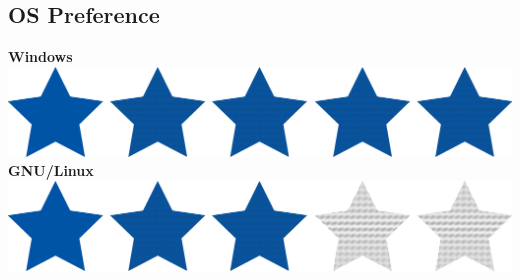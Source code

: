 \documentclass[a4paper]{friggeri-cv}
\begin{document}
\begin{aside}
        \section{OS Preference}\label{sec:os-preference}
        \textbf{Windows}\includegraphics[scale=0.33]{../assets/images/stars/5stars.png}
        \textbf{GNU/Linux}\includegraphics[scale=0.33]{../assets/images/stars/3stars.png}
        ~
    \end{aside}
    ~
\end{document}
